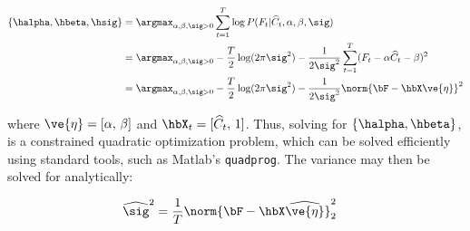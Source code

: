 \documentclass[12pt]{article}
\newcommand{\hC}{\widehat{C}}
\newcommand{\hn}{\widehat{n}}
\newcommand{\hnm}{\widehat{\bn}}
\newcommand{\hCm}{\widehat{\bC}}
\begin{document}
\begin{align} 
\{\halpha, \hbeta, \hsig\} &= \argmax_{\alpha, \beta, \sig > 0} \sum_{t=1}^T \log P(F_t | \hC_t, \alpha, \beta, \sig) \nonumber \\
&=  \argmax_{\alpha, \beta, \sig > 0} -\frac{T}{2} \log (2 \pi \sig^2)  - \frac{1}{2\sig^2} \sum_{t=1}^T (F_t - \alpha \hC_{t} - \beta )^2 \nonumber \\
&=   \argmax_{\alpha, \beta, \sig > 0} -\frac{T}{2} \log (2 \pi \sig^2)  - \frac{1}{2\sig^2} \norm{\bF- \hbX \ve{\eta}}^2 \label{eq:lik2}
\end{align}

%
%
%
%

\noindent where  $\ve{\eta}=[\alpha, \, \beta]$  and $\hbX_t=[\hC_{t}, \, 1]$.  Thus, solving for $\{\halpha,\hbeta\}$, is a constrained quadratic optimization problem, which can be solved efficiently using standard tools, such as Matlab's \texttt{quadprog}.  The variance may then be solved for analytically:

\begin{align} 
\widehat{\sig}^2 &= \frac{1}{T} \norm{\bF - \hbX \widehat{\ve{\eta}}}_2^2 \label{eq:sig}
\end{align}
\end{document}
